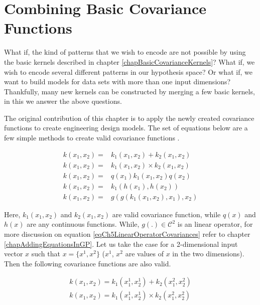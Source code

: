 \chapter{Combining Basic Covariance Functions}
\label{chapCombiningBasicCovariances}

What if, the kind of patterns that we wish to encode are not possible by using the basic kernels described in chapter \ref{chapBasicCovarianceKernels}? What if, we wish to encode several different patterns in our hypothesis space? Or what if, we want to build models for data sets with more than one input dimensions? Thankfully, many new kernels can be constructed by merging a few basic kernels, in this we answer the above questions. 

The original contribution of this chapter is to apply the newly created covariance functions to create engineering design models. The set of equations below are a few simple methods to create valid covariance functions \cite{bishop2006pattern, mackay2003information, durrande2001etude, durrande2013anova}. 

\begin{align}
k(x_{1}, x_{2}) =  & k_{1}(x_{1}, x_{2}) + k_{2}(x_{1}, x_{2})  \label{eqCh5AddingCovariances} \\
k(x_{1}, x_{2}) =  & k_{1}(x_{1}, x_{2}) \times k_{2}(x_{1}, x_{2}) \label{eqCh5MultiplyingCovariances} \\
k(x_{1}, x_{2}) =  & q(x_{1})k_{1}(x_{1}, x_{2})q(x_{2}) \label{eqCh5MultiplyingWithFunction} \\
k(x_{1}, x_{2}) =  & k_{1}(h(x_{1}), h(x_{2})) \label{eqCh5ComposedCovariances} \\
k(x_{1}, x_{2}) =  & g(g(k_{1}(x_{1}, x_{2}), x_{1}), x_{2} ) \label{eqCh5LinearOperatorCovariances}
\end{align}


Here, $k_{1}(x_{1}, x_{2})$ and $k_{2}(x_{1}, x_{2})$ are valid covariance function, while $q(x)$ and $h(x)$ are any continuous functions. While, $g\left ( . \right ) \in \mathcal{C}^{2}$ is an linear operator, for more discussion on equation \ref{eqCh5LinearOperatorCovariances} refer to chapter \ref{chapAddingEquationsInGP}. Let us take the case for a 2-dimensional input vector $x$ such that $x = \{x^{1}, x^{2}\}$ ($x^{1}$, $x^{2}$ are values of $x$ in the two dimensions). Then the following covariance functions are also valid.

\begin{align}
k(x_{1}, x_{2}) = k_{1}(x_{1}^{1}, x_{2}^{1}) + k_{2}(x_{1}^{2}, x_{2}^{2}) \label{eqCh5AddingAcrossDimensionsCovariances} \\
k(x_{1}, x_{2}) = k_{1}(x_{1}^{1}, x_{2}^{1}) \times k_{2}(x_{1}^{2}, x_{2}^{2}) \label{eqCh5MultiplyingAcrossDimensionsCovariances} 
\end{align}

